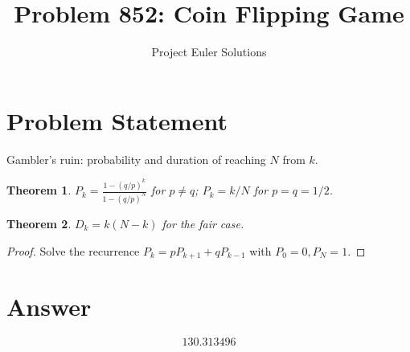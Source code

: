 \documentclass[11pt]{article}
\title{Problem 852: Coin Flipping Game}
\author{Project Euler Solutions}
\date{}
\newtheorem{theorem}{Theorem}
\begin{document}
\maketitle
\section{Problem Statement}
Gambler's ruin: probability and duration of reaching $N$ from $k$.
\begin{theorem}
$P_k = \frac{1-(q/p)^k}{1-(q/p)^N}$ for $p \ne q$; $P_k = k/N$ for $p = q = 1/2$.
\end{theorem}
\begin{theorem}
$D_k = k(N-k)$ for the fair case.
\end{theorem}
\begin{proof}
Solve the recurrence $P_k = pP_{k+1} + qP_{k-1}$ with $P_0=0, P_N=1$.
\end{proof}
\section{Answer}

\[
\boxed{130.313496}
\]
\end{document}
